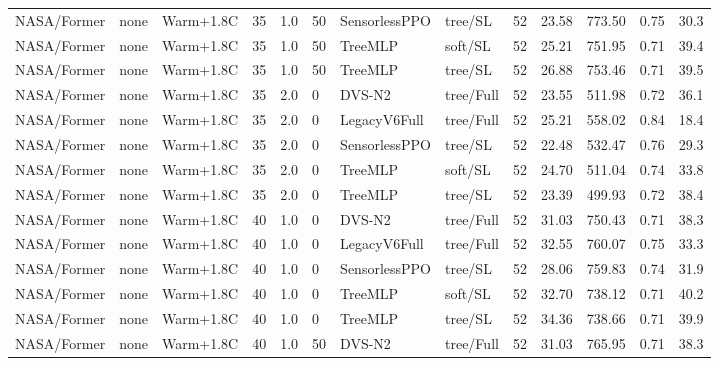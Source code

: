 \documentclass[10pt,a4paper]{article}
\begin{document}
\begin{landscape}
\begin{longtable}{llllllllrrrrr}
NASA/Former & none & Warm+1.8C & 35 & 1.0 & 50 & SensorlessPPO & tree/SL & 52 & 23.58 & 773.50 & 0.75 & 30.3 \\

NASA/Former & none & Warm+1.8C & 35 & 1.0 & 50 & TreeMLP & soft/SL & 52 & 25.21 & 751.95 & 0.71 & 39.4 \\

NASA/Former & none & Warm+1.8C & 35 & 1.0 & 50 & TreeMLP & tree/SL & 52 & 26.88 & 753.46 & 0.71 & 39.5 \\

NASA/Former & none & Warm+1.8C & 35 & 2.0 & 0 & DVS-N2 & tree/Full & 52 & 23.55 & 511.98 & 0.72 & 36.1 \\

NASA/Former & none & Warm+1.8C & 35 & 2.0 & 0 & LegacyV6Full & tree/Full & 52 & 25.21 & 558.02 & 0.84 & 18.4 \\

NASA/Former & none & Warm+1.8C & 35 & 2.0 & 0 & SensorlessPPO & tree/SL & 52 & 22.48 & 532.47 & 0.76 & 29.3 \\

NASA/Former & none & Warm+1.8C & 35 & 2.0 & 0 & TreeMLP & soft/SL & 52 & 24.70 & 511.04 & 0.74 & 33.8 \\

NASA/Former & none & Warm+1.8C & 35 & 2.0 & 0 & TreeMLP & tree/SL & 52 & 23.39 & 499.93 & 0.72 & 38.4 \\

NASA/Former & none & Warm+1.8C & 40 & 1.0 & 0 & DVS-N2 & tree/Full & 52 & 31.03 & 750.43 & 0.71 & 38.3 \\

NASA/Former & none & Warm+1.8C & 40 & 1.0 & 0 & LegacyV6Full & tree/Full & 52 & 32.55 & 760.07 & 0.75 & 33.3 \\

NASA/Former & none & Warm+1.8C & 40 & 1.0 & 0 & SensorlessPPO & tree/SL & 52 & 28.06 & 759.83 & 0.74 & 31.9 \\

NASA/Former & none & Warm+1.8C & 40 & 1.0 & 0 & TreeMLP & soft/SL & 52 & 32.70 & 738.12 & 0.71 & 40.2 \\

NASA/Former & none & Warm+1.8C & 40 & 1.0 & 0 & TreeMLP & tree/SL & 52 & 34.36 & 738.66 & 0.71 & 39.9 \\

NASA/Former & none & Warm+1.8C & 40 & 1.0 & 50 & DVS-N2 & tree/Full & 52 & 31.03 & 765.95 & 0.71 & 38.3 \\


\end{longtable}
\end{landscape}
\end{document}
